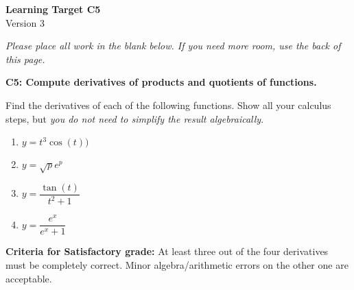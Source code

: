 \documentclass[10pt]{article}
\begin{document}
	\vspace*{0in}

		\begin{center}
			\textbf{Learning Target C5} \\
			{Version 3} \\
		\end{center}

\emph{Please place all work in the blank below. If you need more room, use the back of this page.}

\begin{framed}
	\textbf{C5: Compute derivatives of products and quotients of functions.}
\end{framed}

Find the derivatives of each of the following functions. Show all your calculus steps, but \emph{you do not need to simplify the result algebraically}. 

\begin{enumerate}
    \item $y = t^3 \cos(t))$
    \item $y = \sqrt{p}e^p$
    \item $y = \dfrac{\tan(t)}{t^2 + 1}$
    \item $y = \dfrac{e^x}{e^x + 1}$
\end{enumerate}

\vfill


\begin{small}
    \begin{framed}
        	\textbf{Criteria for Satisfactory grade:} At least three out of the four derivatives must be completely correct. Minor algebra/arithmetic errors on the other one are acceptable. 
    \end{framed}

\end{small}
\end{document}
